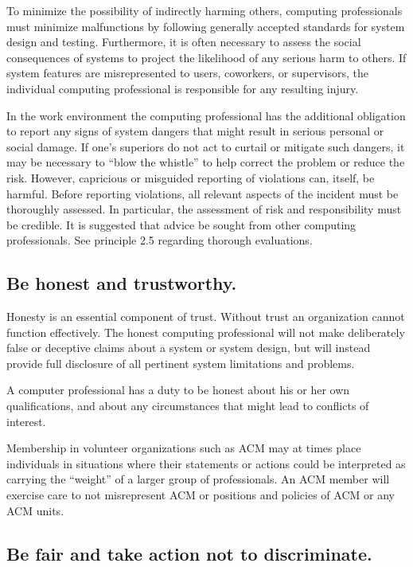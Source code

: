 \documentclass{article}
\begin{document}
To minimize the possibility of indirectly harming others, computing
professionals must minimize malfunctions by following generally accepted
standards for system design and testing. Furthermore, it is often necessary to
assess the social consequences of systems to project the likelihood of any
serious harm to others. If system features are misrepresented to users,
coworkers, or supervisors, the individual computing professional is responsible
for any resulting injury.

In the work environment the computing professional has the additional
obligation to report any signs of system dangers that might result in serious
personal or social damage. If one's superiors do not act to curtail or mitigate
such dangers, it may be necessary to ``blow the whistle'' to help correct the
problem or reduce the risk. However, capricious or misguided reporting of
violations can, itself, be harmful. Before reporting violations, all relevant
aspects of the incident must be thoroughly assessed. In particular, the
assessment of risk and responsibility must be credible. It is suggested that
advice be sought from other computing professionals. See principle 2.5
regarding thorough evaluations.

\subsection{Be honest and trustworthy.}

Honesty is an essential component of trust. Without trust an organization
cannot function effectively. The honest computing professional will not make
deliberately false or deceptive claims about a system or system design, but
will instead provide full disclosure of all pertinent system limitations and
problems.

A computer professional has a duty to be honest about his or her own
qualifications, and about any circumstances that might lead to conflicts of
interest.

Membership in volunteer organizations such as ACM may at times place
individuals in situations where their statements or actions could be
interpreted as carrying the ``weight'' of a larger group of professionals. An
ACM member will exercise care to not misrepresent ACM or positions and policies
of ACM or any ACM units.

\subsection{Be fair and take action not to discriminate.}
\end{document}
